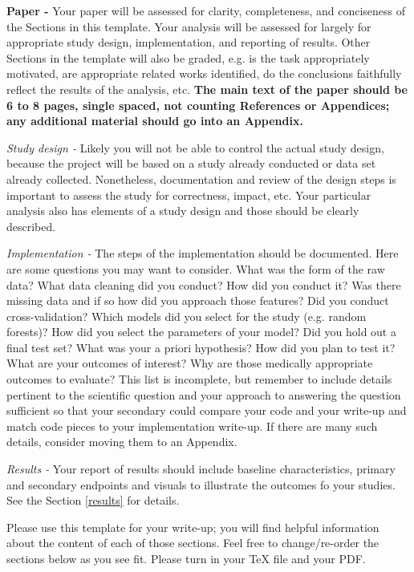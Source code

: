 \documentclass[twoside,11pt]{article}
\begin{document}
\textbf{Paper -} Your paper will be assessed for clarity, completeness, and conciseness of the Sections in this template. Your analysis will be assessed for largely for appropriate study design, implementation, and reporting of results. Other Sections in the template will also be graded, e.g. is the task appropriately motivated, are appropriate related works identified, do the conclusions faithfully reflect the results of the analysis, etc. \textbf{The main text of the paper should be 6 to 8 pages, single spaced, not counting References or Appendices; any additional material should go into an Appendix.}

\emph{Study design -} Likely you will not be able to control the actual study design, because the project will be based on a study already conducted or data set already collected. Nonetheless, documentation and review of the design steps is important to assess the study for correctness, impact, etc. Your particular analysis also has elements of a study design and those should be clearly described.

\emph{Implementation -} The steps of the implementation should be documented. Here are some questions you may want to consider. What was the form of the raw data? What data cleaning did you conduct? How did you conduct it? Was there missing data and if so how did you approach those features? Did you conduct cross-validation? Which models did you select for the study (e.g. random forests)? How did you select the parameters of your model? Did you hold out a final test set? What was your a priori hypothesis? How did you plan to test it? What are your outcomes of interest? Why are those medically appropriate outcomes to evaluate? This list is incomplete, but remember to include details pertinent to the scientific question and your approach to answering the question sufficient so that your secondary could compare your code and your write-up and match code pieces to your implementation write-up. If there are many such details, consider moving them to an Appendix.

\emph{Results -} Your report of results should include baseline characteristics, primary and secondary endpoints and visuals to illustrate the outcomes fo your studies. See the Section \ref{results} for details.

Please use this template for your write-up; you will find helpful information about the content of each of those sections. Feel free to change/re-order the sections below as you see fit. Please turn in your TeX file and your PDF.
\end{document}
